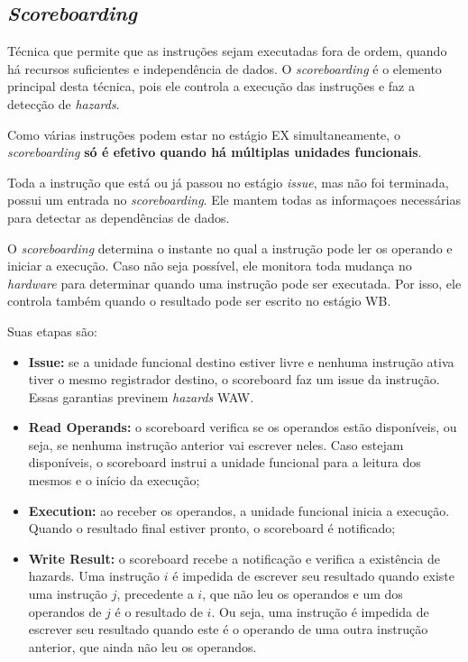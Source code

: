 \subsection{\textit{Scoreboarding}}
Técnica que permite que as instruções sejam executadas fora de ordem, quando há recursos suficientes e independência de dados. O \textit{scoreboarding} é o elemento principal desta técnica, pois ele controla a execução das instruções e faz a detecção de \textit{hazards}.

Como várias instruções podem estar no estágio EX simultaneamente, o \textit{scoreboarding} \textbf{só é efetivo quando há múltiplas unidades funcionais}.

Toda a instrução que está ou já passou no estágio \textit{issue}, mas não foi terminada, possui um entrada no \textit{scoreboarding}. Ele mantem todas as informaçoes necessárias para detectar as dependências de dados.

O \textit{scoreboarding} determina o instante no qual a instrução pode ler os operando e iniciar a execução. Caso não seja possível, ele monitora toda mudança no \textit{hardware} para determinar quando uma instrução pode ser executada. Por isso, ele controla também quando o resultado pode ser escrito no estágio WB.

Suas etapas são:
\begin{itemize}
  \item \textbf{Issue:} se a unidade funcional destino estiver livre e nenhuma instrução ativa tiver o mesmo registrador destino, o scoreboard faz um issue da instrução. Essas garantias previnem \textit{hazards} WAW.

  \item \textbf{Read Operands:} o scoreboard verifica se os operandos estão disponíveis, ou seja, se nenhuma instrução anterior vai escrever neles. Caso estejam disponíveis, o scoreboard instrui a unidade funcional para a leitura dos mesmos e o início da execução;

  \item \textbf{Execution:} ao receber os operandos, a unidade funcional inicia a execução. Quando o resultado final estiver pronto, o scoreboard é notificado;

  \item \textbf{Write Result:} o scoreboard recebe a notificação e verifica a existência de hazards. Uma instrução $i$ é impedida de escrever seu resultado quando existe uma instrução $j$, precedente a $i$, que não leu os operandos e um dos operandos de $j$ é o resultado de $i$. Ou seja, uma instrução é impedida de escrever seu resultado quando este é o operando de uma outra instrução anterior, que ainda não leu os operandos.
\end{itemize}

